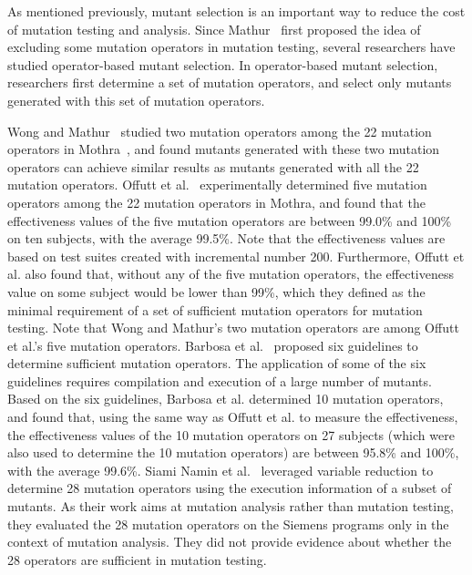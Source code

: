As mentioned previously, mutant selection is an important way to
reduce the cost of mutation testing and analysis. Since
Mathur~\cite{Mathur:91} first proposed the idea of excluding some
mutation operators in mutation testing, several researchers have
studied operator-based mutant selection. In operator-based mutant
selection, researchers first determine a set of mutation
operators, and select only mutants generated with this set of
mutation operators.

Wong and Mathur~\cite{Wong:93,Wong:95} studied two mutation
operators among the 22 mutation operators in
Mothra~\cite{DeMillo:87}, and found mutants generated with these
two mutation operators can achieve similar results as mutants
generated with all the 22 mutation operators. Offutt et
al.~\cite{Offutt:96} experimentally determined five mutation
operators among the 22 mutation operators in Mothra, and found
that the effectiveness values of the five mutation operators are
between 99.0\% and 100\% on ten subjects, with the average 99.5\%.
Note that the effectiveness values are based on test suites
created with incremental number 200. Furthermore, Offutt et al.
also found that, without any of the five mutation operators, the
effectiveness value on some subject would be lower than 99\%,
which they defined as the minimal requirement of a set of
sufficient mutation operators for mutation testing. Note that Wong
and Mathur's two mutation operators are among Offutt et al.'s five
mutation operators. Barbosa et al.~\cite{Barbosa:01} proposed six
guidelines to determine sufficient mutation operators. The
application of some of the six guidelines requires compilation and
execution of a large number of mutants. Based on the six
guidelines, Barbosa et al. determined 10 mutation operators, and
found that, using the same way as Offutt et al. to measure the
effectiveness, the effectiveness values of the 10 mutation
operators on 27 subjects (which were also used to determine the 10
mutation operators) are between 95.8\% and 100\%, with the average
99.6\%. Siami Namin et al.~\cite{SiamiNamin:08} leveraged variable
reduction to determine 28 mutation operators using the execution
information of a subset of mutants. As their work aims at mutation
analysis rather than mutation testing, they evaluated the 28
mutation operators on the Siemens programs only in the context of
mutation analysis. They did not provide evidence about whether the
28 operators are sufficient in mutation testing.

